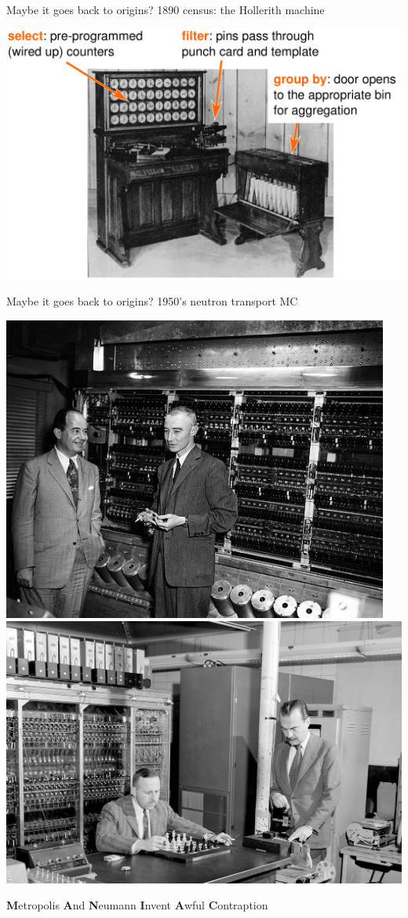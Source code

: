 \documentclass[aspectratio=169]{beamer}
\begin{document}
\begin{frame}{Maybe it goes back to origins? 1890 census: the Hollerith machine}
\vspace{0.25 cm}
\begin{center}
\includegraphics[width=0.83\linewidth]{hh-tabulator.pdf}
\end{center}
\end{frame}

\begin{frame}{Maybe it goes back to origins? 1950's neutron transport MC}
\vspace{0.5 cm}

\includegraphics[height=5 cm]{neumann_oppie.jpg} \includegraphics[height=5 cm]{metropolis.jpg}

\begin{center}
\Large {\bf M}etropolis {\bf A}nd {\bf N}eumann {\bf I}nvent {\bf A}wful {\bf C}ontraption
\end{center}
\end{frame}
\end{document}

